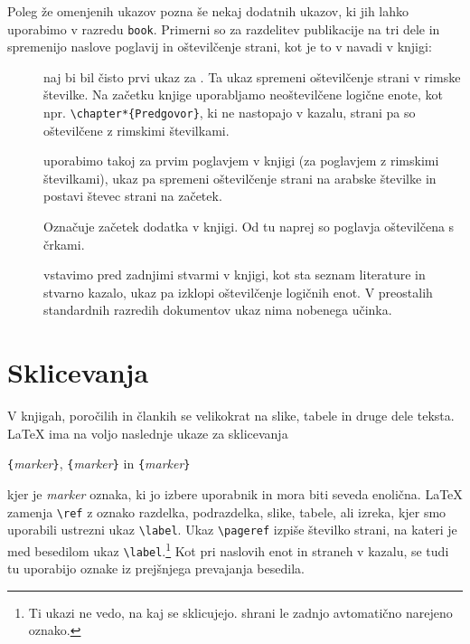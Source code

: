 Poleg že omenjenih ukazov \LaTeXe{} pozna še nekaj dodatnih ukazov, ki jih lahko uporabimo v razredu \verb|book|. 
Primerni so za razdelitev publikacije na tri dele in spremenijo 
naslove poglavij in oštevilčenje strani, kot je to v navadi v knjigi:
\begin{description}
\item[] naj bi bil čisto prvi ukaz za 
  \verb||. Ta ukaz spremeni oštevilčenje strani v rimske številke. Na začetku
    knjige uporabljamo neoštevilčene logične enote, kot npr. \verb|\chapter*{Predgovor}|, ki ne nastopajo v
    kazalu, strani pa so oštevilčene z rimskimi številkami.
\item[] uporabimo takoj za prvim poglavjem v knjigi (za poglavjem z rimskimi številkami),
  ukaz pa spremeni oštevilčenje strani na arabske številke in postavi števec strani na začetek.
\item[] Označuje začetek dodatka v knjigi. Od tu naprej so poglavja oštevilčena s črkami.
\item[] vstavimo pred zadnjimi stvarmi v knjigi, kot sta seznam literature in stvarno kazalo,
  ukaz pa izklopi oštevilčenje logičnih enot. V preostalih standardnih razredih dokumentov ukaz nima nobenega učinka.
\end{description}

\section{Sklicevanja}

V knjigah, poročilih in člankih se velikokrat  na slike, tabele in druge dele teksta.
\LaTeX{} ima na voljo naslednje ukaze za sklicevanja
\begin{lscommand}
\verb|{|\emph{marker}\verb|}|, \verb|{|\emph{marker}\verb|}| 
in \verb|{|\emph{marker}\verb|}|
\end{lscommand}
\noindent kjer je \emph{marker} oznaka, ki jo izbere uporabnik in mora biti seveda enolična.
\LaTeX{} zamenja \verb|\ref| z oznako razdelka, podrazdelka, slike, tabele, ali izreka, kjer smo uporabili
ustrezni ukaz \verb|\label|. Ukaz \verb|\pageref| izpiše številko strani, na kateri je med besedilom ukaz 
\verb|\label|.\footnote{Ti ukazi ne vedo, na kaj se sklicujejo.  shrani le zadnjo avtomatično narejeno
  oznako.} Kot pri naslovih enot in straneh v kazalu, se tudi tu uporabijo oznake iz prejšnjega prevajanja 
  besedila.

